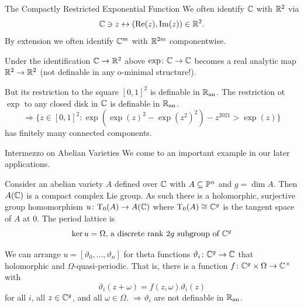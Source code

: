 \documentclass{beamer}
\begin{document}
\begin{frame}{The Compactly Restricted Exponential Function}
  We often identify ${\mathbb{C}}$ with ${\mathbb{R}}^2$ via
  \begin{equation*}
    {\mathbb{C}}\ni z\leftrightarrow (\mathrm{Re}(z),\mathrm{Im}(z))\in{\mathbb{R}}^2.
  \end{equation*}
  By extension we often
  identify ${\mathbb{C}}^m$ with ${\mathbb{R}}^{2m}$ componentwise.


  \begin{example}
    Under the identification
    ${\mathbb{C}}\rightarrow{\mathbb{R}}^2$  above
    $\exp\colon{\mathbb{C}}\rightarrow{\mathbb{C}}$ becomes a real analytic map
    ${\mathbb{R}}^2\rightarrow{\mathbb{R}}^2$ (\alert{not} definable in any
    o-minimal structure!).
    
    But its restriction to the square $[0,1]^2$ is definable in ${{\mathbb{R}}_{\mathrm{an}}}$.
    The restriction ot $\exp$ to any
    closed disk in ${\mathbb{C}}$ is definable in ${{\mathbb{R}}_{\mathrm{an}}}$.
    \begin{equation*}
      \Rightarrow\{z\in [0,1]^2 : \exp(\exp(z)^2-\exp(z^2)^2)-z^{2021} > \exp(z)\}
    \end{equation*}
    has finitely many connected components.
  \end{example}
\end{frame}

\begin{frame}{Intermezzo on Abelian Varieties}
  We come to an important example in our later applications. 

  Consider an abelian variety $A$
  defined over ${\mathbb{C}}$ with $A\subseteq {\mathbb{P}}^n$ and $g=\dim A$.
  Then $A({\mathbb{C}})$ is a compact complex Lie group. As such there is a
  holomorphic, surjective group homomorphism $u\colon \mathrm{T}_0(A) \rightarrow
  A({\mathbb{C}})$
  where $\mathrm{T}_0(A)\cong {\mathbb{C}}^g$ is the tangent space of $A$ at
  $0$. The \alert{period lattice} is
  \begin{equation*}
    \ker u = \Omega\text{, a discrete rank $2g$ subgroup of ${\mathbb{C}}^g$}
  \end{equation*}
  

  We can arrange $u = [\vartheta_0,\ldots,\vartheta_n]$ for theta
  functions $\vartheta_i \colon {\mathbb{C}}^g \rightarrow{\mathbb{C}}$ that holomorphic
  and $\Omega$-quasi-periodic.
  That is, there is a function $f\colon {\mathbb{C}}^g\times \Omega\rightarrow
  {\mathbb{C}}^\times$ with 
  \begin{equation}
    \vartheta_i(z+\omega) = f(z,\omega) \vartheta_i(z)
  \end{equation}
  for all $i$, all $z\in{\mathbb{C}}^g$, and all $\omega\in\Omega$.
  $\Rightarrow \vartheta_i$ are \alert{not} definable in ${{\mathbb{R}}_{\mathrm{an}}}$. 
\end{frame}
\end{document}

